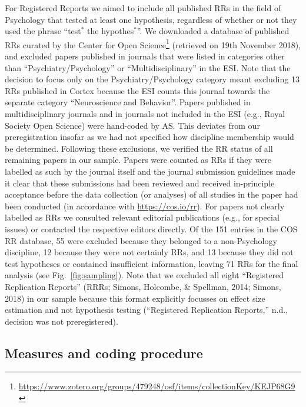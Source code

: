 \documentclass[british,,man,floatsintext]{apa6}
\begin{document}
For Registered Reports we aimed to include all published RRs in the field of Psychology that tested at least one hypothesis, regardless of whether or not they used the phrase \enquote{test\(^\ast\) the hypothes\(^\ast\)}.
We downloaded a database of published RRs curated by the Center for Open Science\footnote{\url{https://www.zotero.org/groups/479248/osf/items/collectionKey/KEJP68G9}} (retrieved on 19th November 2018), and excluded papers published in journals that were listed in categories other than \enquote{Psychiatry/Psychology} or \enquote{Multidisciplinary} in the ESI.
Note that the decision to focus only on the Psychiatry/Psychology category meant excluding 13 RRs published in Cortex because the ESI counts this journal towards the separate category \enquote{Neuroscience and Behavior}.
Papers published in multidisciplinary journals and in journals not included in the ESI (e.g., Royal Society Open Science) were hand-coded by AS.
This deviates from our preregistration insofar as we had not specified how discipline membership would be determined.
Following these exclusions, we verified the RR status of all remaining papers in our sample.
Papers were counted as RRs if they were labelled as such by the journal itself and the journal submission guidelines made it clear that these submissions had been reviewed and received in-principle acceptance before the data collection (or analyses) of all studies in the paper had been conducted (in accordance with \url{https://cos.io/rr}).
For papers not clearly labelled as RRs we consulted relevant editorial publications (e.g., for special issues) or contacted the respective editors directly.
Of the 151 entries in the COS RR database, 55 were excluded because they belonged to a non-Psychology discipline, 12 because they were not certainly RRs, and 13 because they did not test hypotheses or contained insufficient information, leaving 71 RRs for the final analysis (see Fig.~\ref{fig:sampling}).
Note that we excluded all eight \enquote{Registered Replication Reports} (RRRs; Simons, Holcombe, \& Spellman, 2014; Simons, 2018) in our sample because this format explicitly focusses on effect size estimation and not hypothesis testing (``Registered Replication Reports,'' n.d., decision was not preregistered).

\hypertarget{measures-and-coding-procedure}{%
\subsection{Measures and coding procedure}\label{measures-and-coding-procedure}}
\end{document}
